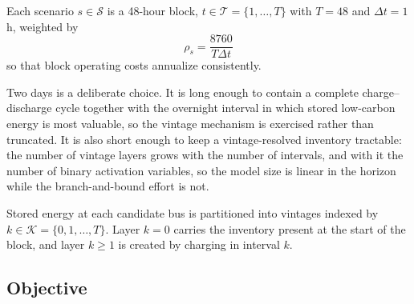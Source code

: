\documentclass[journal]{IEEEtran}
\begin{document}
Each scenario $s\in\mathcal{S}$ is a 48-hour block,
$t\in\mathcal{T}=\{1,\dots,T\}$ with $T=48$ and $\Delta t=1$\,h, weighted
by
\begin{equation}
\rho_s=\frac{8760}{T\Delta t}
\label{eq:annualization}
\end{equation}
so that block operating costs annualize consistently.

Two days is a deliberate choice. It is long enough to contain a complete
charge--discharge cycle together with the overnight interval in which
stored low-carbon energy is most valuable, so the vintage mechanism is
exercised rather than truncated. It is also short enough to keep a
vintage-resolved inventory tractable: the number of vintage layers grows
with the number of intervals, and with it the number of binary activation
variables, so the model size is linear in the horizon while the
branch-and-bound effort is not.

Stored energy at each candidate bus is partitioned into vintages indexed
by $k\in\mathcal{K}=\{0,1,\dots,T\}$. Layer $k=0$ carries the inventory
present at the start of the block, and layer $k\geq1$ is created by
charging in interval $k$.

\subsection{Objective}
\label{sec:objective}
\end{document}
